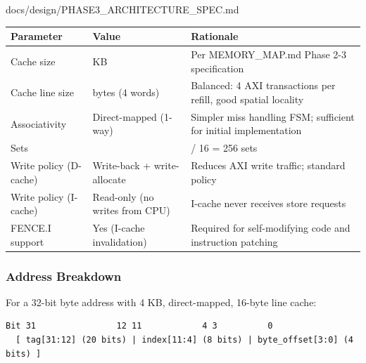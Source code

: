 \begin{relocated}{docs/design/PHASE3_ARCHITECTURE_SPEC.md}
{{
\begin{longtable}[]{@{}
  >{\raggedright\arraybackslash}p{}
  >{\raggedright\arraybackslash}p{}
  >{\raggedright\arraybackslash}p{}@{}}
\toprule\noalign{}
\begin{minipage}[b]{\linewidth}\raggedright
Parameter
\end{minipage} & \begin{minipage}[b]{\linewidth}\raggedright
Value
\end{minipage} & \begin{minipage}[b]{\linewidth}\raggedright
Rationale
\end{minipage} \\
\midrule\noalign{}
\endhead
\bottomrule\noalign{}
\endlastfoot
Cache size & 4 KB & Per MEMORY\_\allowbreak{}MAP.md Phase 2-3
specification \\
Cache line size & 16 bytes (4 words) & Balanced: 4 AXI transactions per
refill, good spatial locality \\
Associativity & Direct-mapped (1-way) & Simpler miss handling FSM;
sufficient for initial implementation \\
Sets & 256 & 4096 / 16 = 256 sets \\
Write policy (D-cache) & Write-back + write-allocate & Reduces AXI write
traffic; standard policy \\
Write policy (I-cache) & Read-only (no writes from CPU) & I-cache never
receives store requests \\
FENCE.I support & Yes (I-cache invalidation) & Required for
self-modifying code and instruction patching \\
\end{longtable}
}

}

\subsubsection{Address Breakdown}\label{ds:ch:phase3-architecture:22-address-breakdown}

For a 32-bit byte address with 4 KB, direct-mapped, 16-byte line cache:

\begin{lstlisting}[language={}]
Bit 31                12 11            4 3          0
  [ tag[31:12] (20 bits) | index[11:4] (8 bits) | byte_offset[3:0] (4 bits) ]
\end{lstlisting}


\end{relocated}

